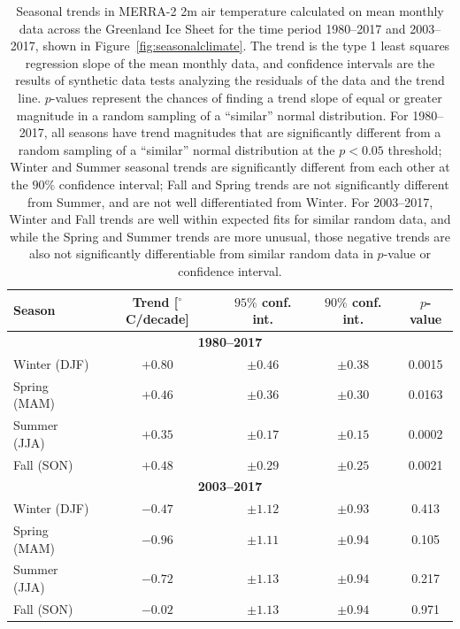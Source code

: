\documentclass[11pt]{report}
\begin{document}
\begin{table}[!h]
\begin{center}
\begin{tabular}{ |l|c|c|c|c| } 
\hline
\bfseries{Season} & \bfseries{Trend [$^{\circ}$C/decade]} & \bfseries{$95\%$ conf. int.} & \bfseries{$90\%$ conf. int.} & \bfseries{$p$-value}\\              
\hline
\multicolumn{5}{|c|}{\bfseries{1980--2017}} \\
\hline
Winter (DJF)	& $+0.80$	& $\pm0.46$	& $\pm0.38$	& 	0.0015 \\ 	
\hline
Spring (MAM)	& $+0.46$	& $\pm0.36$	& $\pm0.30$	&	0.0163 \\
\hline
Summer (JJA)	& $+0.35$	& $\pm0.17$	& $\pm0.15$	&	0.0002\\
\hline
Fall (SON)	& $+0.48$	& $\pm0.29$	& $\pm0.25$	&	0.0021\\
\hline
\multicolumn{5}{|c|}{\bfseries{2003--2017}} \\
\hline
Winter (DJF)	& $-0.47$	& $\pm 1.12 $	& $\pm 0.93$	& 	0.413 \\ 	
\hline
Spring (MAM)	& $-0.96$	& $\pm 1.11$	& $\pm 0.94$	&	0.105  \\
\hline
Summer (JJA)	& $-0.72$	& $\pm 1.13$	& $\pm 0.94$	&	0.217\\
\hline
Fall (SON)		& $-0.02$	& $\pm 1.13$	& $\pm 0.94$	&	0.971\\
\hline\end{tabular}
\caption[Seasonal 2m temperature trends over the Greenland Ice Sheet: 1980--2017]{Seasonal trends in MERRA-2 2m air temperature calculated on mean monthly data across the Greenland Ice Sheet for the time period 1980--2017 and 2003--2017, shown in Figure~\ref{fig:seasonalclimate}. The trend is the type 1 least squares regression slope of the mean monthly data, and confidence intervals are the results of synthetic data tests analyzing the residuals of the data and the trend line. $p$-values represent the chances of finding a trend slope of equal or greater magnitude in a random sampling of a ``similar'' normal distribution. For 1980--2017, all seasons have trend magnitudes that are significantly different from a random sampling of a ``similar'' normal distribution at the $p < 0.05$ threshold; Winter and Summer seasonal trends are significantly different from each other at the $90\%$ confidence interval; Fall and Spring trends are not significantly different from Summer, and are not well differentiated from Winter. For 2003--2017, Winter and Fall trends are well within expected fits for similar random data, and while the Spring and Summer trends are more unusual, those negative trends are also not significantly differentiable from similar random data in $p$-value or confidence interval. \label{tab:seasonaltrends}}
\end{center}
\end{table}
\end{document}
